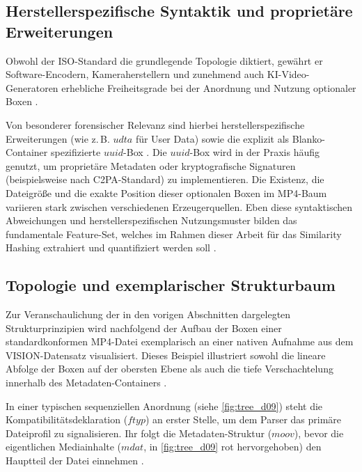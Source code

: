 
\subsection{Herstellerspezifische Syntaktik und proprietäre Erweiterungen}

Obwohl der ISO-Standard die grundlegende Topologie diktiert, gewährt er Software-Encodern, Kameraherstellern und zunehmend auch KI-Video-Generatoren erhebliche Freiheitsgrade bei der Anordnung und Nutzung optionaler Boxen \cite[S. S71]{gloe_forensic_2014}. 

Von besonderer forensischer Relevanz sind hierbei herstellerspezifische Erweiterungen (wie z.\,B. \(udta\) für User Data) sowie die explizit als Blanko-Container spezifizierte \(uuid\)-Box \cite[Kap. 8.2]{iso_14496-12_2022}. Die \(uuid\)-Box wird in der Praxis häufig genutzt, um proprietäre Metadaten oder kryptografische Signaturen (beispielsweise nach C2PA-Standard) zu implementieren. Die Existenz, die Dateigröße und die exakte Position dieser optionalen Boxen im MP4-Baum variieren stark zwischen verschiedenen Erzeugerquellen. Eben diese syntaktischen Abweichungen und herstellerspezifischen Nutzungsmuster bilden das fundamentale Feature-Set, welches im Rahmen dieser Arbeit für das Similarity Hashing extrahiert und quantifiziert werden soll \cite[S. S75]{gloe_forensic_2014}.


\subsection{Topologie und exemplarischer Strukturbaum}

Zur Veranschaulichung der in den vorigen Abschnitten dargelegten Strukturprinzipien wird nachfolgend der Aufbau der Boxen einer standardkonformen MP4-Datei exemplarisch an einer nativen Aufnahme aus dem VISION-Datensatz \cite{shullani_vision_2017} visualisiert. Dieses Beispiel illustriert sowohl die lineare Abfolge der Boxen auf der obersten Ebene als auch die tiefe Verschachtelung innerhalb des Metadaten-Containers \cite[Kap. 8]{iso_14496-12_2022}.

In einer typischen sequenziellen Anordnung (siehe \cref{fig:tree_d09}) steht die Kompatibilitätsdeklaration (\(ftyp\)) an erster Stelle, um dem Parser das primäre Dateiprofil zu signalisieren. Ihr folgt die Metadaten-Struktur (\(moov\)), bevor die eigentlichen Mediainhalte (\(mdat\), in \cref{fig:tree_d09} rot hervorgehoben) den Hauptteil der Datei einnehmen \cite[S. S69]{gloe_forensic_2014}.

